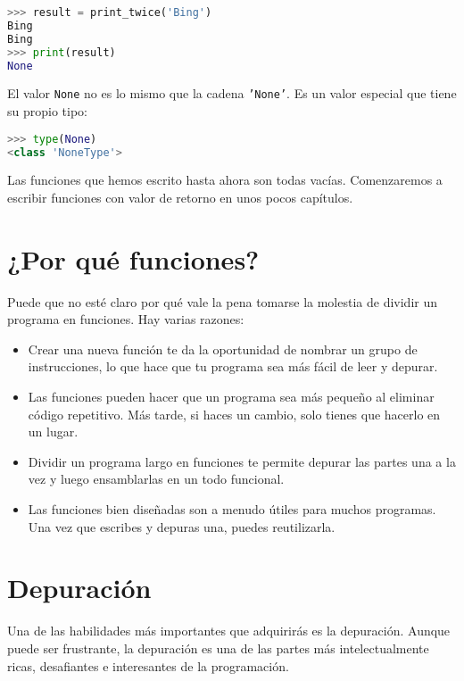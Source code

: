 \documentclass[12pt,letterpaper]{book}
\begin{document}
\begin{lstlisting}[language=Python]
>>> result = print_twice('Bing')
Bing
Bing
>>> print(result)
None
\end{lstlisting}

El valor \texttt{None} no es lo mismo que la cadena \texttt{'None'}. Es un valor especial que tiene su propio tipo:

\begin{lstlisting}[language=Python]
>>> type(None)
<class 'NoneType'>
\end{lstlisting}

Las funciones que hemos escrito hasta ahora son todas vacías. Comenzaremos a escribir funciones con valor de retorno en unos pocos capítulos.

\section{¿Por qué funciones?}

Puede que no esté claro por qué vale la pena tomarse la molestia de dividir un programa en funciones. Hay varias razones:

\begin{itemize}
\item Crear una nueva función te da la oportunidad de nombrar un grupo de instrucciones, lo que hace que tu programa sea más fácil de leer y depurar.

\item Las funciones pueden hacer que un programa sea más pequeño al eliminar código repetitivo. Más tarde, si haces un cambio, solo tienes que hacerlo en un lugar.

\item Dividir un programa largo en funciones te permite depurar las partes una a la vez y luego ensamblarlas en un todo funcional.

\item Las funciones bien diseñadas son a menudo útiles para muchos programas. Una vez que escribes y depuras una, puedes reutilizarla.
\end{itemize}

\section{Depuración}

Una de las habilidades más importantes que adquirirás es la depuración. Aunque puede ser frustrante, la depuración es una de las partes más intelectualmente ricas, desafiantes e interesantes de la programación.
\end{document}
